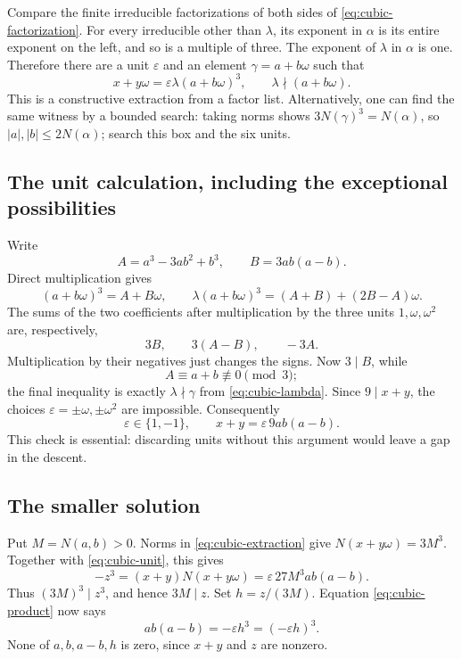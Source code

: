 Compare the finite irreducible factorizations of both sides of
\eqref{eq:cubic-factorization}.  For every irreducible other than
$\lambda$, its exponent in $\alpha$ is its entire exponent on the
left, and so is a multiple of three.  The exponent of $\lambda$ in
$\alpha$ is one.  Therefore there are a unit $\varepsilon$ and an
element $\gamma=a+b\omega$ such that
\begin{equation}
 x+y\omega=\varepsilon\lambda(a+b\omega)^3,
 \qquad \lambda\nmid(a+b\omega).
 \label{eq:cubic-extraction}
\end{equation}
This is a constructive extraction from a factor list.  Alternatively,
one can find the same witness by a bounded search: taking norms shows
$3N(\gamma)^3=N(\alpha)$, so
$|a|,|b|\le2N(\alpha)$; search this box and the six units.

\subsection{The unit calculation, including the exceptional possibilities}

Write
\[
 A=a^3-3ab^2+b^3,\qquad B=3ab(a-b).
\]
Direct multiplication gives
\[
 (a+b\omega)^3=A+B\omega,
 \qquad
 \lambda(a+b\omega)^3=(A+B)+(2B-A)\omega.
\]
The sums of the two coefficients after multiplication by the three
units $1,\omega,\omega^2$ are, respectively,
\[
 3B,\qquad 3(A-B),\qquad -3A.
\]
Multiplication by their negatives just changes the signs.  Now
$3\mid B$, while
\[
 A\equiv a+b\not\equiv0\pmod3;
\]
the final inequality is exactly $\lambda\nmid\gamma$ from
\eqref{eq:cubic-lambda}.  Since $9\mid x+y$, the choices
$\varepsilon=\pm\omega,\pm\omega^2$ are impossible.  Consequently
\begin{equation}
 \varepsilon\in\{1,-1\},\qquad
 x+y=\varepsilon\,9ab(a-b).
 \label{eq:cubic-unit}
\end{equation}
This check is essential: discarding units without this argument would
leave a gap in the descent.

\subsection{The smaller solution}

Put $M=N(a,b)>0$.  Norms in \eqref{eq:cubic-extraction} give
$N(x+y\omega)=3M^3$.  Together with
\eqref{eq:cubic-unit}, this gives
\begin{equation}
 -z^3=(x+y)N(x+y\omega)
      =\varepsilon\,27M^3ab(a-b).
 \label{eq:cubic-product}
\end{equation}
Thus $(3M)^3\mid z^3$, and hence $3M\mid z$.  Set
$h=z/(3M)$.  Equation \eqref{eq:cubic-product} now says
\[
 ab(a-b)=-\varepsilon h^3=(-\varepsilon h)^3.
\]
None of $a,b,a-b,h$ is zero, since $x+y$ and $z$ are nonzero.


